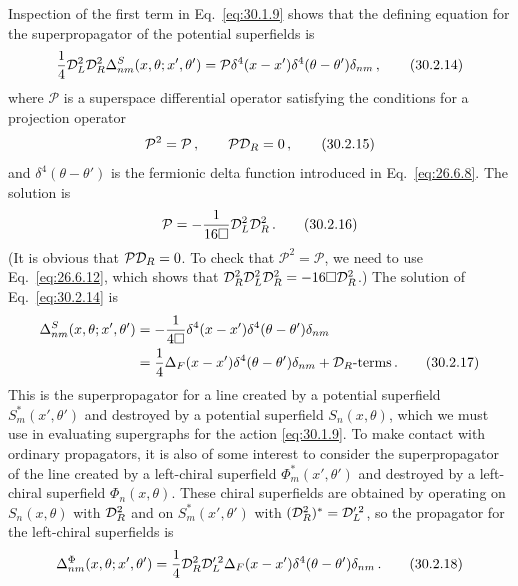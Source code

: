 Inspection of the first term in Eq.~\eqref{eq:30.1.9} shows that the
defining equation for the superpropagator of the potential superfields is
\begin{equation}
  \frac14\mathcal{D}_L^2\mathcal{D}_R^2
  \Delta^S_{nm}(x,\theta;x',\theta')
  =\mathcal{P}\delta^4(x-x')\delta^4(\theta-\theta')\delta_{nm}\,,
  \tag{30.2.14}\label{eq:30.2.14}
\end{equation}
where \(\mathcal{P}\) is a superspace differential operator satisfying the
conditions for a projection operator
\begin{equation}
  \mathcal{P}^2=\mathcal{P}\,,
  \qquad
  \mathcal{P}\mathcal{D}_R=0\,,
  \tag{30.2.15}\label{eq:30.2.15}
\end{equation}
and \(\delta^4(\theta-\theta')\) is the fermionic delta function introduced
in Eq.~\eqref{eq:26.6.8}. The solution is
\begin{equation}
  \mathcal{P}=-\frac{1}{16\Box}\mathcal{D}_L^2\mathcal{D}_R^2\,.
  \tag{30.2.16}\label{eq:30.2.16}
\end{equation}
(It is obvious that \(\mathcal{P}\mathcal{D}_R=0\). To check that
\(\mathcal{P}^2=\mathcal{P}\), we need to use Eq.~\eqref{eq:26.6.12}, which
shows that
\(\mathcal{D}_R^2\mathcal{D}_L^2\mathcal{D}_R^2=-16\Box\mathcal{D}_R^2\).) The solution of
Eq.~\eqref{eq:30.2.14} is
\begin{align}
  \Delta^S_{nm}(x,\theta;x',\theta')
  &=-\frac{1}{4\Box}
    \delta^4(x-x')\delta^4(\theta-\theta')\delta_{nm}
  \notag\\
  &=\frac14\Delta_F(x-x')\delta^4(\theta-\theta')\delta_{nm}
    +\mathcal{D}_R\text{-terms}\,.
  \tag{30.2.17}\label{eq:30.2.17}
\end{align}
This is the superpropagator for a line created by a potential superfield
\(S_m^*(x',\theta')\) and destroyed by a potential superfield
\(S_n(x,\theta)\), which we must use in evaluating supergraphs for the action
\eqref{eq:30.1.9}. To make contact with ordinary propagators, it is also of
some interest to consider the superpropagator of the line created by a
left-chiral superfield \(\Phi_m^*(x',\theta')\) and destroyed by a
left-chiral superfield \(\Phi_n(x,\theta)\). These chiral superfields are
obtained by operating on \(S_n(x,\theta)\) with \(\mathcal{D}_R^2\) and on
\(S_m^*(x',\theta')\) with
\((\mathcal{D}_R^2)^*=\mathcal{D}_L^{\prime\,2}\), so the propagator for the
left-chiral superfields is
\begin{equation}
  \Delta^\Phi_{nm}(x,\theta;x',\theta')
  =\frac14\mathcal{D}_R^2\mathcal{D}_L^{\prime\,2}
    \Delta_F(x-x')\delta^4(\theta-\theta')\delta_{nm}\,.
  \tag{30.2.18}\label{eq:30.2.18}
\end{equation}
